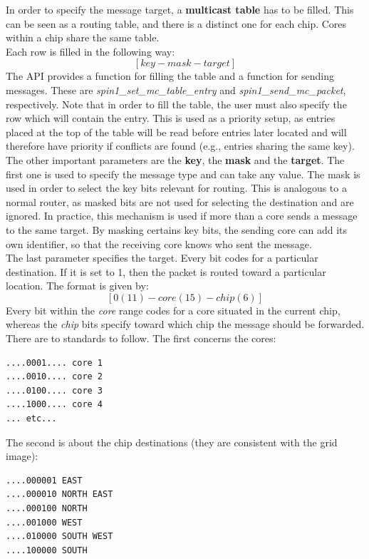 \documentclass{article}
\begin{document}
In order to specify the message target, a \textbf{multicast table} has to be filled. This can be seen as a routing table, and there is a distinct one for each chip. Cores within a chip share the same table.\\
Each row is filled in the following way:
\[
[key  -  mask -  target]
\]
The API provides a function for filling the table and a function for sending messages. These are \textit{spin1\_set\_mc\_table\_entry} and \textit{spin1\_send\_mc\_packet}, respectively. Note that in order to fill the table, the user must also specify the row which will contain the entry. This is used as a priority setup, as entries placed at the top of the table will be read before entries later located and will therefore have priority if conflicts are found (e.g., entries sharing the same key).\\

The other important parameters are the \textbf{key}, the \textbf{mask} and the \textbf{target}. The first one is used to specify the message type and can take any value. The mask is used in order to select the key bits relevant for routing. This is analogous to a normal router, as masked bits are not used for selecting the destination and are ignored. In practice, this mechanism is used if more than a core sends a message to the same target. By masking certains key bits, the sending core can add its own identifier, so that the receiving core knows who sent the message.\\
The last parameter specifies the target. Every bit codes for a particular destination. If it is set to 1, then the packet is routed toward a particular location. The format is given by:
\[
[ 0 (11) - core (15) - chip (6)]
\]
Every bit within the \textit{core} range codes for a core situated in the current chip, whereas the \textit{chip} bits specify toward which chip the message should be forwarded. \\
There are to standards to follow. The first concerns the cores:
\begin{verbatim}
....0001.... core 1
....0010.... core 2
....0100.... core 3
....1000.... core 4
... etc...
\end{verbatim}

The second is about the chip destinations (they are consistent with the grid image):
\begin{verbatim}
....000001 EAST
....000010 NORTH EAST
....000100 NORTH
....001000 WEST
....010000 SOUTH WEST
....100000 SOUTH
\end{verbatim}
\end{document}
